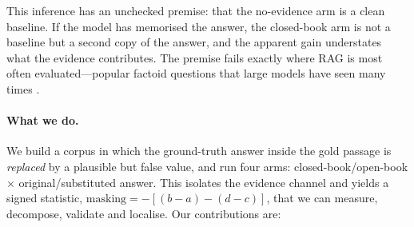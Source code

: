 \documentclass[11pt]{article}
\newcommand{\mask}{\ensuremath{\mathrm{masking}}}
\begin{document}
This inference has an unchecked premise: that the no-evidence arm is a clean baseline.
If the model has memorised the answer, the closed-book arm is not a baseline but a second
copy of the answer, and the apparent gain understates what the evidence contributes. The
premise fails exactly where RAG is most often evaluated---popular factoid questions that
large models have seen many times \citep{kandpal2023,carlini2023}.

\paragraph{What we do.}
We build a corpus in which the ground-truth answer inside the gold passage is \emph{replaced}
by a plausible but false value, and run four arms: closed-book/open-book $\times$
original/substituted answer. This isolates the evidence channel and yields a signed
statistic, $\mask = -[(b-a)-(d-c)]$, that we can measure, decompose, validate and localise.
Our contributions are:
\end{document}

